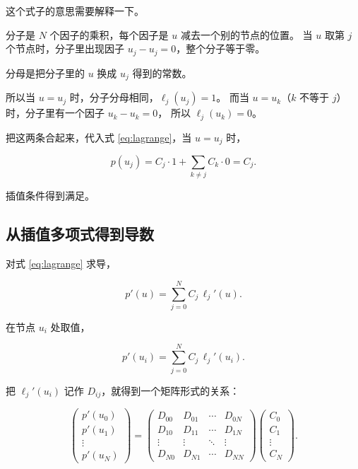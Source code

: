 这个式子的意思需要解释一下。

分子是 $N$ 个因子的乘积，每个因子是 $u$ 减去一个别的节点的位置。
当 $u$ 取第 $j$ 个节点时，分子里出现因子 $u_j-u_j=0$，整个分子等于零。

分母是把分子里的 $u$ 换成 $u_j$ 得到的常数。

所以当 $u=u_j$ 时，分子分母相同，$\ell_j(u_j)=1$。
而当 $u=u_k$（$k$ 不等于 $j$）时，分子里有一个因子 $u_k-u_k=0$，
所以 $\ell_j(u_k)=0$。

把这两条合起来，代入式 \eqref{eq:lagrange}，当 $u=u_j$ 时，

\begin{equation}
p(u_j) = C_j\cdot1 + \sum_{k\ne j}C_k\cdot0 = C_j .
\end{equation}

插值条件得到满足。

\subsection{从插值多项式得到导数}

对式 \eqref{eq:lagrange} 求导，

\begin{equation}
p'(u) = \sum_{j=0}^{N}C_j\,\ell_j'(u).
\end{equation}

在节点 $u_i$ 处取值，

\begin{equation}
p'(u_i) = \sum_{j=0}^{N}C_j\,\ell_j'(u_i).
\end{equation}

把 $\ell_j'(u_i)$ 记作 $D_{ij}$，就得到一个矩阵形式的关系：

\begin{equation}
\begin{pmatrix} p'(u_0)\\ p'(u_1)\\ \vdots\\ p'(u_N)\end{pmatrix}
=
\begin{pmatrix}
D_{00} & D_{01} & \cdots & D_{0N}\\
D_{10} & D_{11} & \cdots & D_{1N}\\
\vdots & \vdots & \ddots & \vdots\\
D_{N0} & D_{N1} & \cdots & D_{NN}
\end{pmatrix}
\begin{pmatrix} C_0\\ C_1\\ \vdots\\ C_N\end{pmatrix}.
\label{eq:dmatrix}
\end{equation}


